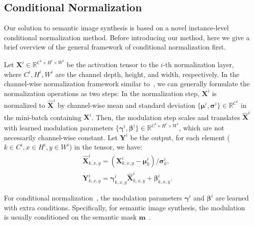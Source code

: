 \documentclass[final]{cvpr}
\begin{document}
\subsection{Conditional Normalization}
\label{sec:normalization}
Our solution to semantic image synthesis is based on a novel instance-level conditional normalization method. Before introducing our method, here we give a brief overview of the general framework of conditional normalization first.

Let $\bm{X}^i\in\mathbb{R}^{C^i\times H^i\times W^i}$ be the activation tensor to the $i$-th normalization layer, where $C^i, H^i, W^i$ are the channel depth, height, and width, respectively. In the channel-wise normalization framework similar to~\cite{ioffe2015batch}, we can generally formulate the normalization operations as two steps: In the normalization step, $\bm{X}^i$ is normalized to $\bm{\hat{X}}^i$ by channel-wise mean and standard deviation $\{\bm{\mu}^i,\bm{\sigma}^i\}\in\mathbb{R}^{C^i}$ in the mini-batch containing $\bm{X}^i$. Then, the modulation step scales and translates $\bm{\hat{X}}^i$ with learned modulation parameters $\{\bm{\gamma}^i,\bm{\beta}^i\}\in\mathbb{R}^{C^i\times H^i\times W^i}$, which are not necessarily channel-wise constant. Let $\bm{Y}^i$ be the output, for each element ($k\in C^i, x\in H^i, y\in W^i$) in the tensor, we have:
\begin{equation}
\begin{split}
  \bm{\hat{X}}^i_{k,x,y}=(\bm{X}^i_{k,x,y}-\bm{\mu}^i_k)/\bm{\sigma}^i_k, \\
  \bm{Y}^i_{k,x,y}=\bm{\gamma}^i_{k,x,y}\bm{\hat{X}}^i_{k,x,y}+\bm{\beta}^i_{k,x,y}.
 \end{split}
\end{equation}

For conditional normalization~\cite{dumoulin2016learned,huang2017arbitrary}, the modulation parameters $\bm{\gamma}^i$ and $\bm{\beta}^i$ are learned with extra conditions. Specifically, for semantic image synthesis, the modulation is usually conditioned on the semantic mask $\bm{m}$~\cite{park2019semantic,tan2020semantic}.
\end{document}
